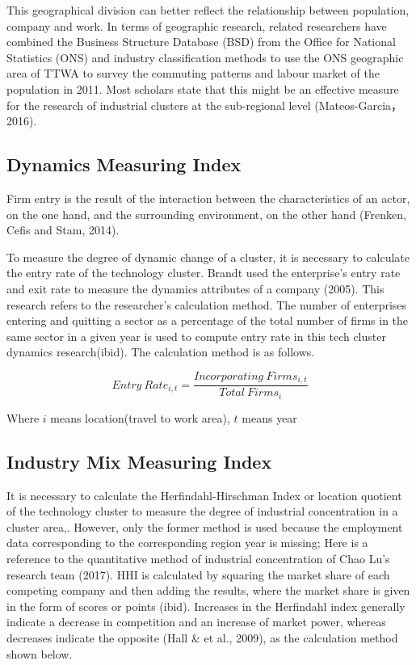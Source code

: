 \documentclass[
  12pt,
  oneside]{book}
\begin{document}
This geographical division can better reflect the relationship between population, company and work. In terms of geographic research, related researchers have combined the Business Structure Database (BSD) from the Office for National Statistics (ONS) and industry classification methods to use the ONS geographic area of TTWA to survey the commuting patterns and labour market of the population in 2011. Most scholars state that this might be an effective measure for the research of industrial clusters at the sub-regional level (Mateos-Garcia，2016).

\hypertarget{dynamics-measuring-index}{%
\subsection{Dynamics Measuring Index}\label{dynamics-measuring-index}}

Firm entry is the result of the interaction between the
characteristics of an actor, on the one hand, and the surrounding environment, on the other hand (Frenken, Cefis and Stam, 2014).

To measure the degree of dynamic change of a cluster, it is necessary to calculate the entry rate of the technology cluster. Brandt used the enterprise's entry rate and exit rate to measure the dynamics attributes of a company (2005). This research refers to the researcher's calculation method. The number of enterprises entering and quitting a sector as a percentage of the total number of firms in the same sector in a given year is used to compute entry rate in this tech cluster dynamics research(ibid). The calculation method is as follows.

\[ Entry\ Rate_{i,t} = \frac{Incorporating\ Firms_{i,t}}{Total\  Firms_{i}} \]

Where \(i\) means location(travel to work area), \(t\) means year

\hypertarget{industry-mix-measuring-index}{%
\subsection{Industry Mix Measuring Index}\label{industry-mix-measuring-index}}

It is necessary to calculate the Herfindahl-Hirschman Index or location quotient of the technology cluster to measure the degree of industrial concentration in a cluster area,. However, only the former method is used because the employment data corresponding to the corresponding region year is missing; Here is a reference to the quantitative method of industrial concentration of Chao Lu's research team (2017). HHI is calculated by squaring the market share of each competing company and then adding the results, where the market share is given in the form of scores or points (ibid). Increases in the Herfindahl index generally indicate a decrease in competition and an increase of market power, whereas decreases indicate the opposite (Hall \& et al., 2009), as the calculation method shown below.
\end{document}
